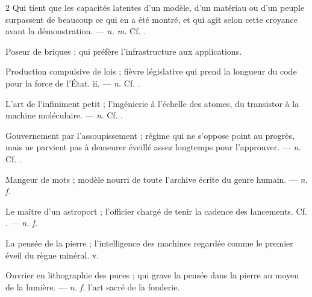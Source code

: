 \begin{multicols}{2}
 Qui tient que les capacités latentes d'un modèle, d'un matériau ou d'un peuple surpassent de beaucoup ce qui en a été montré, et qui agit selon cette croyance avant la démonstration. —  \textit{n. m.} Cf. .

 Poseur de briques ; qui préfère l'infrastructure aux applications. 

 Production compulsive de lois ; fièvre législative qui prend la longueur du code pour la force de l'État.   ii. —  \textit{n.} Cf. .

 L'art de l'infiniment petit ; l'ingénierie à l'échelle des atomes, du transistor à la machine moléculaire. —  \textit{n.} Cf. .

 Gouvernement par l'assoupissement ; régime qui ne s'oppose point au progrès, mais ne parvient pas à demeurer éveillé assez longtemps pour l'approuver. —  \textit{n.} Cf. .

 Mangeur de mots ; modèle nourri de toute l'archive écrite du genre humain.   —  \textit{n. f.}

 Le maître d'un astroport ; l'officier chargé de tenir la cadence des lancements. Cf. . —  \textit{n. f.}

 La pensée de la pierre ; l'intelligence des machines regardée comme le premier éveil du règne minéral.   v.

 Ouvrier en lithographie des puces ; qui grave la pensée dans la pierre au moyen de la lumière. —  \textit{n. f.} l'art sacré de la fonderie.


\end{multicols}

